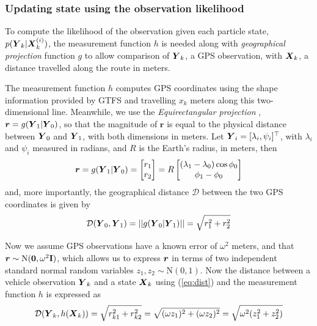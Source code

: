 \afterpage{\clearpage}


\subsubsection{Updating state using the observation likelihood}
\label{sec:pf_update}

To compute the likelihood of the observation given each particle state,
$p(\mbox{$\boldsymbol{Y}$}_k|\mbox{$\boldsymbol{X}$}_k^{(i)})$,
the measurement function $h$ is needed along with 
\emph{geographical projection} function $g$ to allow comparison of $\mbox{$\boldsymbol{Y}$}_k$,
a GPS observation, with $\mbox{$\boldsymbol{X}$}_k$, a distance travelled along the route in meters.

The measurement function $h$ computes GPS coordinates using the 
shape information provided by GTFS and travelling $x_k$ meters along 
this two-dimensional line.
Meanwhile, we use the \emph{Equirectangular projection} \citep{Snyder_1998},
$\boldsymbol{r} = g(\mbox{$\boldsymbol{Y}$}_1 | \mbox{$\boldsymbol{Y}$}_0)$,
so that the magnitude of $\boldsymbol{r}$ is equal to the physical distance
between $\mbox{$\boldsymbol{Y}$}_0$ and $\mbox{$\boldsymbol{Y}$}_1$, with both dimensions in meters.
Let $\mbox{$\boldsymbol{Y}$}_i = [\lambda_i, \psi_i]^\top$,
with $\lambda_i$ and $\psi_i$ measured in radians,  
and $R$ is the Earth's radius, in meters, then
\begin{equation}
\boldsymbol{r} = 
g(\mbox{$\boldsymbol{Y}$}_1 | \mbox{$\boldsymbol{Y}$}_0) = 
    \begin{bmatrix}
        r_1 \\ r_2
    \end{bmatrix} =
    R \begin{bmatrix}
        (\lambda_1 - \lambda_0)\cos\phi_0 \\
        \phi_1 - \phi_0
    \end{bmatrix}
\end{equation}
and, more importantly, the geographical distance $\mathcal{D}$ between the two 
GPS coordinates is given by
\begin{equation}
\label{eq:dist}
\mathcal{D}(\mbox{$\boldsymbol{Y}$}_0, \mbox{$\boldsymbol{Y}$}_1) = ||g(\mbox{$\boldsymbol{Y}$}_0 | \mbox{$\boldsymbol{Y}$}_1)|| = \sqrt{r_1^2 + r_2^2}
\end{equation}


Now we assume GPS observations have a known error of $\omega^2$ meters,
and that \mbox{$\boldsymbol{r} \sim \mathrm{N}(\boldsymbol{0}, \omega^2\mathbf{I})$},
which allows us to express $\boldsymbol{r}$ in terms of two independent
standard normal random variables $z_1, z_2 \sim \mathrm{N}(0,1)$.
Now the distance between a vehicle observation $\mbox{$\boldsymbol{Y}$}_k$
and a state $\mbox{$\boldsymbol{X}$}_k$ using (\ref{eq:dist}) and the measurement function $h$
is expressed as
\begin{equation}
\label{eq:obs_dist}
\mathcal{D}(\mbox{$\boldsymbol{Y}$}_k, h(\mbox{$\boldsymbol{X}$}_k)) = \sqrt{r_{k1}^2 + r_{k2}^2} 
    = \sqrt{(\omega z_1)^2 + (\omega z_2)^2}
    = \sqrt{\omega^2 (z_1^2 + z_2^2)}
\end{equation}

